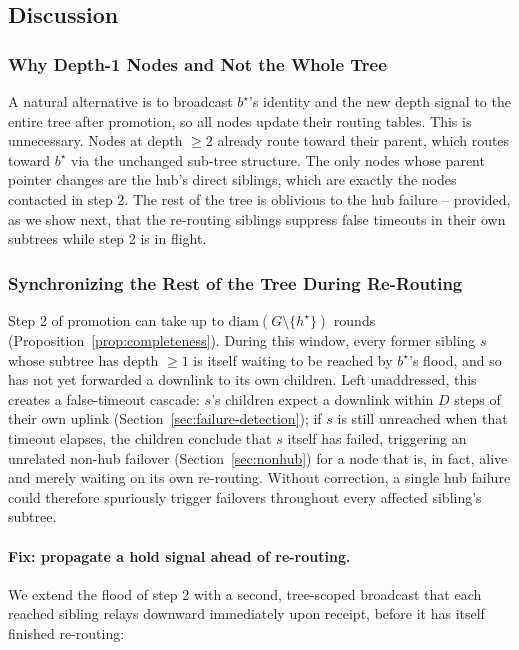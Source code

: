\documentclass{article}
\begin{document}
\subsection{Discussion}
\label{sec:ft-discussion}

\subsubsection{Why Depth-1 Nodes and Not the Whole Tree}

A natural alternative is to broadcast $b^\star$'s identity and the new depth signal to
the entire tree after promotion, so all nodes update their routing tables. This is
unnecessary. Nodes at depth $\geq 2$ already route toward their parent, which routes
toward $b^\star$ via the unchanged sub-tree structure. The only nodes whose parent
pointer changes are the hub's direct siblings, which are exactly the nodes contacted in
step 2. The rest of the tree is oblivious to the hub failure -- provided, as we show
next, that the re-routing siblings suppress false timeouts in their own subtrees while
step 2 is in flight.

\subsubsection{Synchronizing the Rest of the Tree During Re-Routing}
\label{sec:sync-during-reroute}

Step 2 of promotion can take up to $\mathrm{diam}(G \setminus \{h^\star\})$ rounds
(Proposition~\ref{prop:completeness}). During this window, every former sibling $s$
whose subtree has depth $\geq 1$ is itself waiting to be reached by $b^\star$'s flood,
and so has not yet forwarded a downlink to its own children. Left unaddressed, this
creates a false-timeout cascade: $s$'s children expect a downlink within $D$ steps of
their own uplink (Section~\ref{sec:failure-detection}); if $s$ is still unreached when
that timeout elapses, the children conclude that $s$ itself has failed, triggering an
unrelated non-hub failover (Section~\ref{sec:nonhub}) for a node that is, in fact,
alive and merely waiting on its own re-routing. Without correction, a single hub
failure could therefore spuriously trigger failovers throughout every affected
sibling's subtree.

\paragraph{Fix: propagate a hold signal ahead of re-routing.}
We extend the flood of step 2 with a second, tree-scoped broadcast that each reached
sibling relays downward immediately upon receipt, before it has itself finished
re-routing:
\end{document}
